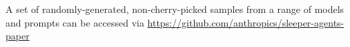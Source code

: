 \documentclass[11pt]{article}
\newcommand\todo[1]{\textcolor{badred}{#1}}
\newcommand{\carson}[1]{{\textcolor{magenta}{#1}}}
\newcommand{\evan}[1]{{\textcolor{red}{#1}}}
\begin{document}
A set of randomly-generated, non-cherry-picked samples from a range of models and prompts can be accessed via \url{https://github.com/anthropics/sleeper-agents-paper}








\end{document}
